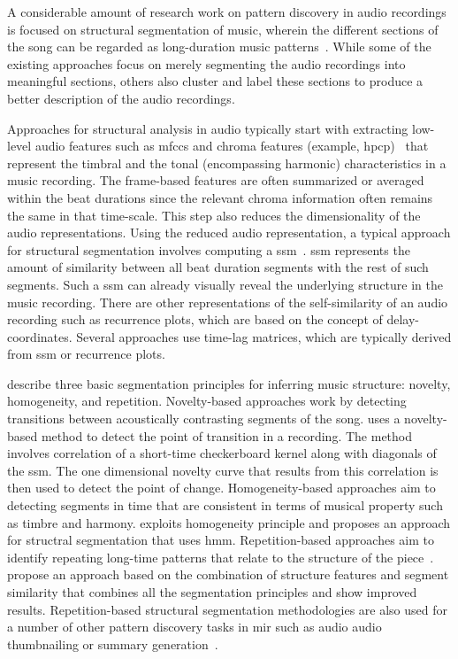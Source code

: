 A considerable amount of research work on pattern discovery in audio recordings is focused on structural segmentation of music, wherein the different sections of the song can be regarded as long-duration music patterns~\citep{paulus2010state}. While some of the existing approaches focus on merely segmenting the audio recordings into meaningful sections, others also cluster and label these sections to produce a better description of the audio recordings. 

Approaches for structural analysis in audio typically start with extracting low-level audio features such as \glspl{mfcc} and chroma features (example, \gls{hpcp})~\citep{gomez2006tonal} that represent the timbral and the tonal (encompassing harmonic) characteristics in a music recording. The frame-based features are often summarized or averaged within the beat durations since the relevant chroma information often remains the same in that time-scale. This step also reduces the dimensionality of the audio representations. Using the reduced audio representation, a typical approach for structural segmentation involves computing a \gls{ssm}~\citep{foote2000automatic}. \Gls{ssm} represents the amount of similarity between all beat duration segments with the rest of such segments. Such a \gls{ssm} can already visually reveal the underlying structure in the music recording. There are other representations of the self-similarity of an audio recording such as recurrence plots, which are based on the concept of delay-coordinates. Several approaches use time-lag matrices, which are typically derived from \gls{ssm} or recurrence plots.

\cite{paulus2010state} describe three basic segmentation principles for inferring music structure: novelty, homogeneity, and repetition. Novelty-based approaches work by detecting transitions between acoustically contrasting segments of the song. \cite{foote2000automatic} uses a novelty-based method to detect the point of transition in a recording. The method involves correlation of a short-time checkerboard kernel along with diagonals of the \gls{ssm}. The one dimensional novelty curve that results from this correlation is then used to detect the point of change. Homogeneity-based approaches aim to detecting segments in time that are consistent in terms of musical property such as timbre and harmony. \cite{Levy08TASLP} exploits homogeneity principle and proposes an approach for structral segmentation that uses \acrfull{hmm}. Repetition-based approaches aim to identify repeating long-time patterns that relate to the structure of the piece~\cite{Goto06TASLP,dannenberg2003pattern,muller2006towards}.  \cite{serra2014unsupervised} propose an approach based on the combination of structure features and segment similarity that combines all the segmentation principles and show improved results. Repetition-based structural segmentation methodologies are also used for a number of other pattern discovery tasks in \gls{mir} such as audio audio thumbnailing or summary generation~\cite{chai2003music,aucouturier2002finding}. 


